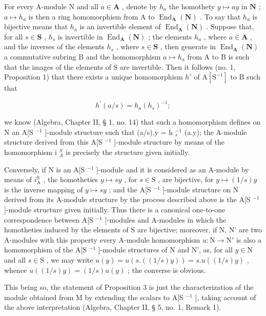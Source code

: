 For every A-module N and all \(a \in \mathbf{A}\) , denote by \(h_a\) the homothety \(y \mapsto ay\) in \(\mathbf{N}\) ; \(a \mapsto h_a\) is then a ring homomorphism from A to \(\operatorname{End}_{\mathbf{A}}(\mathbf{N})\) . To say that \(h_a\) is bijective means that \(h_a\) is an invertible element of \(\operatorname{End}_{\mathbf{A}}(\mathbf{N})\) . Suppose that, for all \(s \in \mathbf{S}\) , \(h_s\) is invertible in \(\operatorname{End}_{\mathbf{A}}(\mathbf{N})\) ; the elements \(h_a\) , where \(a \in \mathbf{A}\) , and the inverses of the elements \(h_s\) , where \(s \in \mathbf{S}\) , then generate in \(\operatorname{End}_{\mathbf{A}}(\mathbf{N})\) a commutative subring B and the homomorphism \(a \mapsto h_a\) from A to B is such that the images of the elements of S are invertible. Then it follows (no. 1, Proposition 1) that there exists a unique homomorphism \(h'\) of \(\mathrm{A}[\mathrm{S}^{-1}]\) to B such that

\[
h ^ {\prime} (a / s) = h _ {a} \left(h _ {s}\right) ^ {- 1};
\]

we know (Algebra, Chapter II, § 1, no. 14) that such a homomorphism defines on N an A{[}S \(^{-1}\) {]}-module structure such that (a/s).y = h \(_{s}^{-1}\) (a.y); the A-module structure derived from this A{[}S \(^{-1}\) {]}-module structure by means of the homomorphism i \(_{A}^{S}\) is precisely the structure given initially.

Conversely, if N is an A{[}S \(^{-1}\) {]}-module and it is considered as an A-module by means of \(i_{\text{A}}^{\text{S}}\) , the homotheties \(y \mapsto sy\) , for \(s \in \text{S}\) , are bijective, for \(y \mapsto (1/s)y\) is the inverse mapping of \(y \mapsto sy\) ; and the A{[}S \(^{-1}\) {]}-module structure on N derived from its A-module structure by the process described above is the A{[}S \(^{-1}\) {]}-module structure given initially. Thus there is a canonical one-to-one correspondence between A{[}S \(^{-1}\) {]}-modules and A-modules in which the homotheties induced by the elements of S are bijective; moreover, if N, N' are two A-modules with this property every A-module homomorphism \(u: \text{N} \to \text{N}'\) is also a homomorphism of the A{[}S \(^{-1}\) {]}-module structures of N and N', as, for all \(y \in \text{N}\) and all \(s \in \text{S}\) , we may write \(u(y) = u(s. ((1/s)y)) = s.u((1/s)y)\) , whence \(u((1/s)y) = (1/s)u(y)\) ; the converse is obvious.

This being so, the statement of Proposition 3 is just the characterization of the module obtained from M by extending the scalars to A{[}S \(^{-1}\) {]}, taking account of the above interpretation (Algebra, Chapter II, § 5, no. 1, Remark 1).

